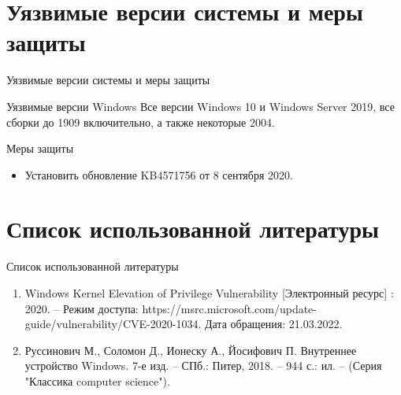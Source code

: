 \documentclass{beamer}
\begin{document}
\section{Уязвимые версии системы и меры защиты}

\begin{frame}{Уязвимые версии системы и меры защиты}
    
    \begin{alertblock}{Уязвимые версии Windows}
        Все версии Windows 10 и Windows Server 2019, все сборки до 1909 включительно, а также некоторые 2004.
    \end{alertblock}
    
    \begin{alertblock}{Меры защиты}
        \begin{itemize}
            \item Установить обновление KB4571756 от 8 сентября 2020.
        \end{itemize}    
    \end{alertblock}

\end{frame}


\section{Список использованной литературы}

\begin{frame}{Список использованной литературы}
    
    \begin{enumerate}
        \item Windows Kernel Elevation of Privilege Vulnerability [Электронный ресурс] : 2020. -- Режим доступа: https://msrc.microsoft.com/update-guide/vulnerability/CVE-2020-1034. Дата обращения: 21.03.2022.
        \item Руссинович М., Соломон Д., Ионеску А., Йосифович П. Внутреннее устройство Windows. 7-е изд. -- СПб.: Питер, 2018. -- 944 с.: ил. -- (Серия "Классика computer science").
    \end{enumerate}
    
\end{frame}
\end{document}
